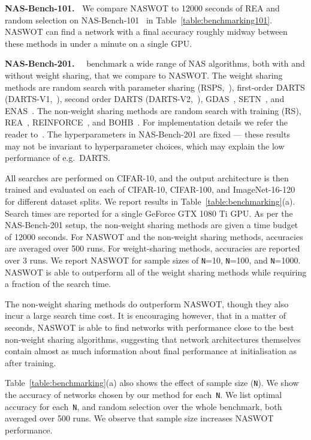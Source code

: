 \documentclass{article}
\begin{document}
\textbf{NAS-Bench-101.\ } We compare NASWOT to 12000 seconds of REA \citep{real2019regularized} and random selection on NAS-Bench-101~\citep{ying2019bench} in Table~\ref{table:benchmarking101}. NASWOT can find a network with a final accuracy roughly midway between these methods in under a minute on a single GPU. 



\textbf{NAS-Bench-201.\ }~\citet{Dong2020NAS-Bench-201} benchmark a wide range of NAS algorithms, both with and without weight sharing, that we compare to NASWOT. The weight sharing methods are random search with parameter sharing (RSPS,~\citealp{li2019random}), first-order DARTS (DARTS-V1,~\citealp{liu2019darts}), second order DARTS (DARTS-V2,~\citealp{liu2019darts}), GDAS~\citep{dong2019searching}, SETN~\citep{dong2019one}, and ENAS~\citep{pham2018efficient}. The non-weight sharing methods are random search with training (RS), REA~\citep{real2019regularized}, REINFORCE~\citep{williams1992simple}, and BOHB~\citep{falkner2018bohb}. For implementation details we refer the reader to~\cite{Dong2020NAS-Bench-201}. The hyperparameters in NAS-Bench-201 are fixed --- these results may not be invariant to hyperparameter choices, which may explain the low performance of e.g.\ DARTS.

All searches are performed on CIFAR-10, and the output architecture is then trained and evaluated on each of CIFAR-10, CIFAR-100, and ImageNet-16-120 for different dataset splits. We report results in Table~\ref{table:benchmarking}(a). Search times are reported for a single GeForce GTX 1080 Ti GPU. As per the NAS-Bench-201 setup, the non-weight sharing methods are given a time budget of 12000 seconds. For NASWOT and the non-weight sharing methods, accuracies are averaged over 500 runs. For weight-sharing methods, accuracies are reported over 3 runs. We report NASWOT for sample sizes of \texttt{N}=10, \texttt{N}=100, and  \texttt{N}=1000. NASWOT is able to outperform all of the weight sharing methods while requiring a fraction of the search time.

The non-weight sharing methods do outperform NASWOT, though they also incur a large search time cost. It is encouraging however, that in a matter of seconds, NASWOT is able to find networks with performance close to the best non-weight sharing algorithms, suggesting that network architectures themselves contain almost as much information about final performance at initialisation as after training. 


Table~\ref{table:benchmarking}(a) also shows the effect of sample size (\texttt{N}). We show the accuracy of networks chosen by our method for each~\texttt{N}. We list optimal accuracy for each~\texttt{N}, and random selection over the whole benchmark, both averaged over 500 runs. We observe that sample size increases NASWOT performance.
\end{document}
